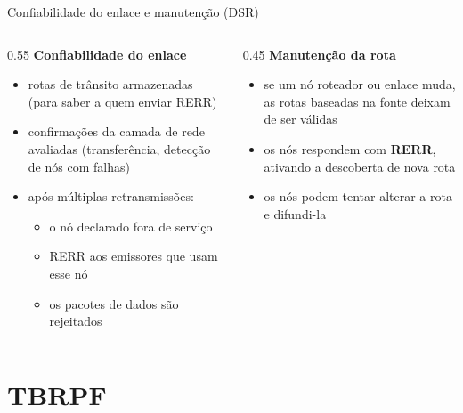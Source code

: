 \documentclass[aspectratio=169,11pt]{beamer}
\begin{document}
\begin{frame}{Confiabilidade do enlace e manutenção (DSR)}
  \begin{columns}
    \begin{column}{0.55\textwidth}
      \textbf{Confiabilidade do enlace}
      \begin{itemize}
        \item rotas de trânsito armazenadas (para saber a quem enviar RERR)
        \item confirmações da camada de rede avaliadas (transferência, detecção de nós com falhas)
        \item após múltiplas retransmissões:
          \begin{itemize}
            \item o nó declarado fora de serviço
            \item RERR aos emissores que usam esse nó
            \item os pacotes de dados são rejeitados
          \end{itemize}
      \end{itemize}
    \end{column}
    \begin{column}{0.45\textwidth}
      \textbf{Manutenção da rota}
      \begin{itemize}
        \item se um nó roteador ou enlace muda, as rotas baseadas na fonte deixam de ser válidas
        \item os nós respondem com \textbf{RERR}, ativando a descoberta de nova rota
        \item os nós podem tentar alterar a rota e difundi-la
      \end{itemize}
    \end{column}
  \end{columns}
\end{frame}

\section{TBRPF}
\end{document}
